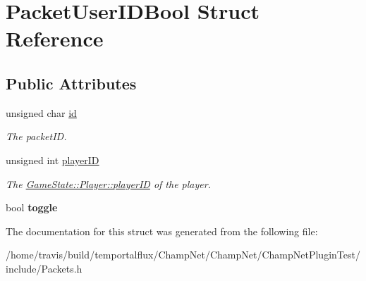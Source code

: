\hypertarget{struct_packet_user_i_d_bool}{\section{Packet\-User\-I\-D\-Bool Struct Reference}
\label{struct_packet_user_i_d_bool}
}
\subsection*{Public Attributes}
\begin{DoxyCompactItemize}
\item 
\hypertarget{struct_packet_user_i_d_bool_a4eb64679d8b3726b8fb253150f447869}{unsigned char \hyperlink{struct_packet_user_i_d_bool_a4eb64679d8b3726b8fb253150f447869}{id}}\label{struct_packet_user_i_d_bool_a4eb64679d8b3726b8fb253150f447869}

\begin{DoxyCompactList}\small\item\em The packet\-I\-D. \end{DoxyCompactList}\item 
\hypertarget{struct_packet_user_i_d_bool_af3819e455a42479fddfbe158ed453ba7}{unsigned int \hyperlink{struct_packet_user_i_d_bool_af3819e455a42479fddfbe158ed453ba7}{player\-I\-D}}\label{struct_packet_user_i_d_bool_af3819e455a42479fddfbe158ed453ba7}

\begin{DoxyCompactList}\small\item\em The \hyperlink{class_game_state_1_1_player_acbd28d89e6eb8611aa66452ec31e9133}{Game\-State\-::\-Player\-::player\-I\-D} of the player. \end{DoxyCompactList}\item 
\hypertarget{struct_packet_user_i_d_bool_ac2e5a00c76f959a218a12be422ffa728}{bool {\bfseries toggle}}\label{struct_packet_user_i_d_bool_ac2e5a00c76f959a218a12be422ffa728}

\end{DoxyCompactItemize}


The documentation for this struct was generated from the following file\-:\begin{DoxyCompactItemize}
\item 
/home/travis/build/temportalflux/\-Champ\-Net/\-Champ\-Net/\-Champ\-Net\-Plugin\-Test/include/Packets.\-h\end{DoxyCompactItemize}
